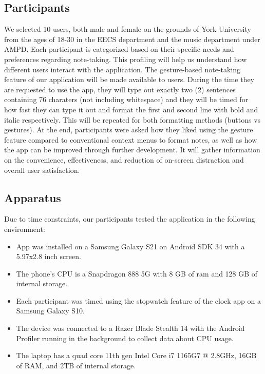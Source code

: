 \documentclass[conference]{IEEEtran}
\begin{document}
\subsection{Participants}
We selected 10 users, both male and female on the grounds of York University from the ages of 18-30 in the EECS department and the music department under AMPD. Each participant is categorized based on their specific needs and preferences regarding note-taking. This profiling will help us understand how different users interact with the application. The gesture-based note-taking feature of our application will be made available to users. During the time they are requested to use the app, they will type out exactly two (2) sentences containing 76 charaters (not including whitespace) and they will be timed for how fast they can type it out and format the first and second line with bold and italic respectively. This will be repeated for both formatting methods (buttons vs gestures). At the end, participants were asked how they liked using the gesture feature compared to conventional context menus to format notes, as well as how the app can be improved through further development. It will gather information on the convenience, effectiveness, and reduction of on-screen distraction and overall user satisfaction.

\subsection{Apparatus}

Due to time constraints, our participants tested the application in the following environment:
\begin{itemize}
    \item App was installed on a Samsung Galaxy S21 on Android SDK 34 with a 5.97x2.8 inch screen.
    \item The phone's CPU is a Snapdragon 888 5G with 8 GB of ram and 128 GB of internal storage.
    \item Each participant was timed using the stopwatch feature of the clock app on a Samsung Galaxy S10.
    \item The device was connected to a Razer Blade Stealth 14 with the Android Profiler running in the background to collect data about CPU usage.
    \item The laptop has a quad core 11th gen Intel Core i7 1165G7 @ 2.8GHz, 16GB of RAM, and 2TB of internal storage.
\end{itemize}   
\end{document}
